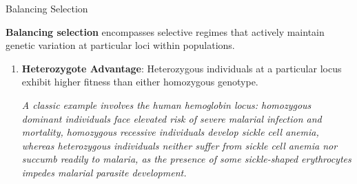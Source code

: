 \documentclass[10pt]{article}
\begin{document}
    \begin{core}{Balancing Selection}

      \textbf{Balancing selection} encompasses selective regimes that actively maintain genetic variation at particular loci within populations.

      \begin{enumerate}


        \item \textbf{Heterozygote Advantage}: Heterozygous individuals at a particular locus exhibit higher fitness than either homozygous genotype. 

        \textit{A classic example involves the human hemoglobin locus: homozygous dominant individuals face elevated risk of severe malarial infection and mortality, homozygous recessive individuals develop sickle cell anemia, whereas heterozygous individuals neither suffer from sickle cell anemia nor succumb readily to malaria, as the presence of some sickle-shaped erythrocytes impedes malarial parasite development.}

      \end{enumerate}

    \end{core}
\end{document}

